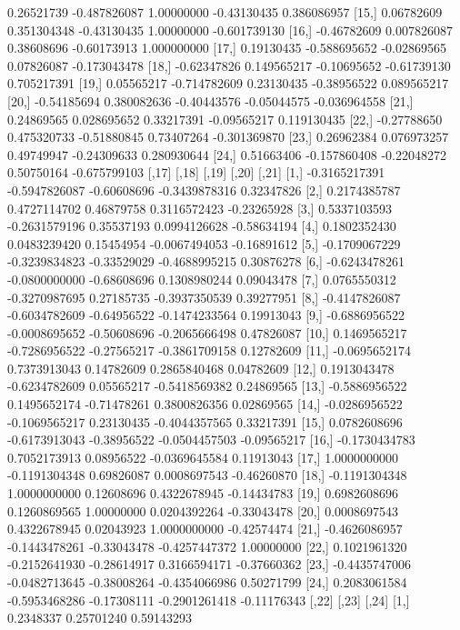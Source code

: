 \documentclass[a4paper]{ article}
\begin{document}
\begin{table}[H]
\begin{Schunk}
\begin{Soutput}
[14,]  0.26521739 -0.487826087  1.00000000 -0.43130435  0.386086957
[15,]  0.06782609  0.351304348 -0.43130435  1.00000000 -0.601739130
[16,] -0.46782609  0.007826087  0.38608696 -0.60173913  1.000000000
[17,]  0.19130435 -0.588695652 -0.02869565  0.07826087 -0.173043478
[18,] -0.62347826  0.149565217 -0.10695652 -0.61739130  0.705217391
[19,]  0.05565217 -0.714782609  0.23130435 -0.38956522  0.089565217
[20,] -0.54185694  0.380082636 -0.40443576 -0.05044575 -0.036964558
[21,]  0.24869565  0.028695652  0.33217391 -0.09565217  0.119130435
[22,] -0.27788650  0.475320733 -0.51880845  0.73407264 -0.301369870
[23,]  0.26962384  0.076973257  0.49749947 -0.24309633  0.280930644
[24,]  0.51663406 -0.157860408 -0.22048272  0.50750164 -0.675799103
              [,17]         [,18]       [,19]         [,20]       [,21]
 [1,] -0.3165217391 -0.5947826087 -0.60608696 -0.3439878316  0.32347826
 [2,]  0.2174385787  0.4727114702  0.46879758  0.3116572423 -0.23265928
 [3,]  0.5337103593 -0.2631579196  0.35537193  0.0994126628 -0.58634194
 [4,]  0.1802352430  0.0483239420  0.15454954 -0.0067494053 -0.16891612
 [5,] -0.1709067229 -0.3239834823 -0.33529029 -0.4688995215  0.30876278
 [6,] -0.6243478261 -0.0800000000 -0.68608696  0.1308980244  0.09043478
 [7,]  0.0765550312 -0.3270987695  0.27185735 -0.3937350539  0.39277951
 [8,] -0.4147826087 -0.6034782609 -0.64956522 -0.1474233564  0.19913043
 [9,] -0.6886956522 -0.0008695652 -0.50608696 -0.2065666498  0.47826087
[10,]  0.1469565217 -0.7286956522 -0.27565217 -0.3861709158  0.12782609
[11,] -0.0695652174  0.7373913043  0.14782609  0.2865840468  0.04782609
[12,]  0.1913043478 -0.6234782609  0.05565217 -0.5418569382  0.24869565
[13,] -0.5886956522  0.1495652174 -0.71478261  0.3800826356  0.02869565
[14,] -0.0286956522 -0.1069565217  0.23130435 -0.4044357565  0.33217391
[15,]  0.0782608696 -0.6173913043 -0.38956522 -0.0504457503 -0.09565217
[16,] -0.1730434783  0.7052173913  0.08956522 -0.0369645584  0.11913043
[17,]  1.0000000000 -0.1191304348  0.69826087  0.0008697543 -0.46260870
[18,] -0.1191304348  1.0000000000  0.12608696  0.4322678945 -0.14434783
[19,]  0.6982608696  0.1260869565  1.00000000  0.0204392264 -0.33043478
[20,]  0.0008697543  0.4322678945  0.02043923  1.0000000000 -0.42574474
[21,] -0.4626086957 -0.1443478261 -0.33043478 -0.4257447372  1.00000000
[22,]  0.1021961320 -0.2152641930 -0.28614917  0.3166594171 -0.37660362
[23,] -0.4435747006 -0.0482713645 -0.38008264 -0.4354066986  0.50271799
[24,]  0.2083061584 -0.5953468286 -0.17308111 -0.2901261418 -0.11176343
           [,22]       [,23]       [,24]
 [1,]  0.2348337  0.25701240  0.59143293

\end{Soutput}
\end{Schunk}
\end{table}
\end{document}
